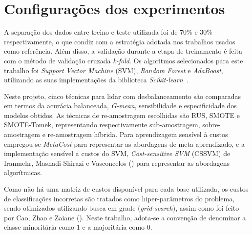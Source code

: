 \section{Configurações dos experimentos}\label{sec:configuracao-experimentos}

A separação dos dados entre treino e teste utilizada foi de \(70\%\) e \(30\%\) respectivamente, o que condiz com a estratégia adotada nos trabalhos usados como referência. Além disso, a validação durante a etapa de treinamento é feita com o método de validação cruzada \textit{k-fold}. Os algoritmos selecionados para este trabalho foi \textit{Support Vector Machine} (SVM), \textit{Random Forest} e \textit{AdaBoost}, utilizando as suas implementações da biblioteca \textit{Scikit-learn}~\cite{Pedregosa2011scikit}.

Neste projeto, cinco técnicas para lidar com desbalanceamento são comparadas em termos da acurácia balanceada, \textit{G-mean}, sensibilidade e especificidade dos modelos obtidos. As técnicas de re-amostragem escolhidas são RUS, SMOTE e SMOTE-Tomek, representando respectivamente sub-amostragem, sobre-amostragem e re-amostragem híbrida. Para aprendizagem sensível à custos empregou-se \textit{MetaCost} para representar as abordagens de meta-aprendizado, e a implementação sensível a custos do SVM, \textit{Cost-sensitive SVM} (CSSVM) de Iranmehr, Masnadi-Shirazi e Vasconcelos (\citeyear{Iranmehr2019}) para representar as abordagens algorítmicas.

Como não há uma matriz de custos disponível para cada base utilizada, os custos de classificações incorretas são tratados como hiper-parâmetros do problema, sendo otimizados utilizando busca em grade (\textit{grid-search}), assim como foi feito por Cao, Zhao e Zaiane (\citeyear{Cao2013}). Neste trabalho, adota-se a convenção de denominar a classe minoritária como 1 e a majoritária como 0.